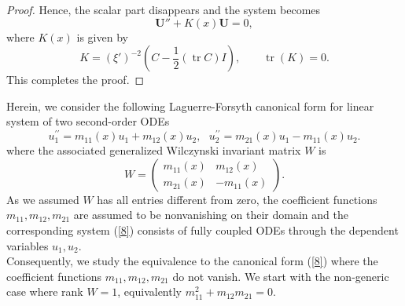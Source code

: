 \documentclass[12pt]{article}
\begin{document}
\begin{proof}
Hence, the scalar part disappears and the system becomes
\begin{equation}
\mathbf{U}''+K(x)\mathbf{U}=0,
\end{equation}
where $K(x)$ is given by
\begin{equation}
K
=
(\xi')^{-2}
\left(
C-\frac12(\operatorname{tr}C)I
\right),
\qquad
\operatorname{tr}(K)=0.
\end{equation}
This completes the proof.
\end{proof}

Herein, we consider the following Laguerre-Forsyth canonical  form for linear system of two second-order ODEs
\begin{equation}\label{8}
u_1^{\prime\prime}=m_{11}(x)u_1+m_{12}(x)u_2,~~~u_2^{\prime\prime}=m_{21}(x)u_1-m_{11}(x)u_2.
\end{equation}
 where the associated generalized  Wilczynski invariant matrix $W$ is  
\begin{equation}\label{170}
W=\begin{pmatrix}
m_{11}(x)&m_{12}(x)\\
m_{21}(x)&-m_{11}(x)
\end{pmatrix}.
\end{equation}
As we assumed $W$ has all entries different from zero, the coefficient functions $m_{11},m_{12},m_{21}$ are assumed to be nonvanishing on their domain and the corresponding system (\ref{8}) consists of fully coupled ODEs through the dependent variables $u_1, u_2$.\\

Consequently, we study the equivalence to the canonical form (\ref{8}) where the coefficient functions $m_{11},m_{12},m_{21}$ do not vanish. We start with the non-generic case where rank $W=1$, equivalently $m_{11}^2+m_{12}m_{21}=0$.
\end{document}
